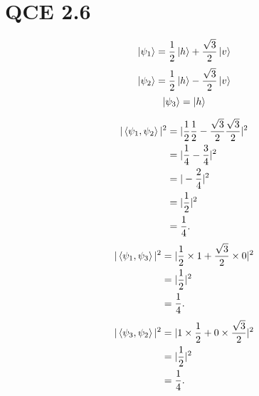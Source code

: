 \documentclass[10pt]{article}
\begin{document}
\section*{QCE 2.6}
\[
\ket{\psi_1} = \frac{1}{2}\ket{h} + \frac{\sqrt{3}}{2} \ket{v}
\]
\[
\ket{\psi_2} = \frac{1}{2}\ket{h} - \frac{\sqrt{3}}{2} \ket{v}
\]
\[
\ket{\psi_3} = \ket{h}
\]

\begin{align*}
|\braket{\psi_1, \psi_2}|^2 &= | \frac{1}{2} \frac{1}{2} - \frac{\sqrt{3}}{2} \frac{\sqrt{3}}{2} |^2 \\
                                          &= | \frac{1}{4} - \frac{3}{4} |^2 \\
                                          &= | -\frac{2}{4} |^2 \\
                                          &= |\frac{1}{2} |^2 \\
                                          &= \frac{1}{4}.
\end{align*}
\begin{align*}
| \braket{\psi_1, \psi_3} |^2 &= | \frac{1}{2} \times 1 + \frac{\sqrt{3}}{2} \times 0|^2 \\
											  &= | \frac{1}{2} |^2 \\
											  &= \frac{1}{4}.                                          
\end{align*}
\begin{align*}
| \braket{\psi_3, \psi_2} |^2 &= | 1 \times \frac{1}{2} + 0 \times \frac{\sqrt{3}}{2} |^2 \\
											 &= | \frac{1}{2} |^2 \\
											 &= \frac{1}{4}.
\end{align*}
\end{document}
